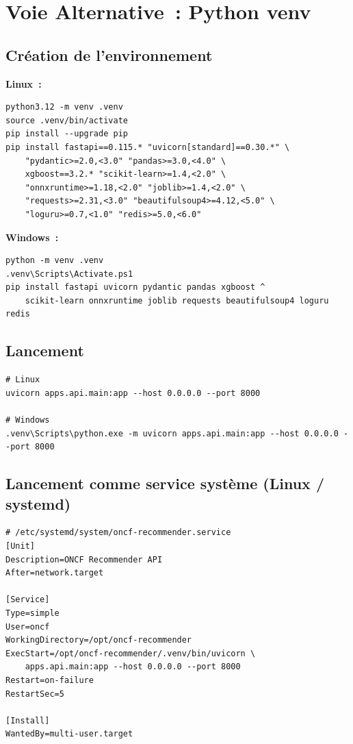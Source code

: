 \documentclass[12pt, a4paper]{report}
\begin{document}
\section{Voie Alternative~: Python venv}

\subsection{Création de l'environnement}

\textbf{Linux~:}
\begin{lstlisting}[style=bash]
python3.12 -m venv .venv
source .venv/bin/activate
pip install --upgrade pip
pip install fastapi==0.115.* "uvicorn[standard]==0.30.*" \
    "pydantic>=2.0,<3.0" "pandas>=3.0,<4.0" \
    xgboost==3.2.* "scikit-learn>=1.4,<2.0" \
    "onnxruntime>=1.18,<2.0" "joblib>=1.4,<2.0" \
    "requests>=2.31,<3.0" "beautifulsoup4>=4.12,<5.0" \
    "loguru>=0.7,<1.0" "redis>=5.0,<6.0"
\end{lstlisting}

\textbf{Windows~:}
\begin{lstlisting}[style=bash]
python -m venv .venv
.venv\Scripts\Activate.ps1
pip install fastapi uvicorn pydantic pandas xgboost ^
    scikit-learn onnxruntime joblib requests beautifulsoup4 loguru redis
\end{lstlisting}

\subsection{Lancement}

\begin{lstlisting}[style=bash]
# Linux
uvicorn apps.api.main:app --host 0.0.0.0 --port 8000

# Windows
.venv\Scripts\python.exe -m uvicorn apps.api.main:app --host 0.0.0.0 --port 8000
\end{lstlisting}

\subsection{Lancement comme service système (Linux / systemd)}

\begin{lstlisting}[style=bash]
# /etc/systemd/system/oncf-recommender.service
[Unit]
Description=ONCF Recommender API
After=network.target

[Service]
Type=simple
User=oncf
WorkingDirectory=/opt/oncf-recommender
ExecStart=/opt/oncf-recommender/.venv/bin/uvicorn \
    apps.api.main:app --host 0.0.0.0 --port 8000
Restart=on-failure
RestartSec=5

[Install]
WantedBy=multi-user.target
\end{lstlisting}
\end{document}
